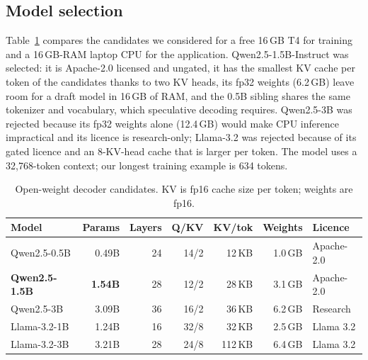 \documentclass[conference]{IEEEtran}
\begin{document}
\subsection{Model selection}
Table~\ref{tab:models} compares the candidates we considered for a free 16\,GB T4 for training and a 16\,GB-RAM laptop CPU for the application. Qwen2.5-1.5B-Instruct was selected: it is Apache-2.0 licensed and ungated, it has the smallest KV cache per token of the candidates thanks to two KV heads, its fp32 weights (6.2\,GB) leave room for a draft model in 16\,GB of RAM, and the 0.5B sibling shares the same tokenizer and vocabulary, which speculative decoding requires. Qwen2.5-3B was rejected because its fp32 weights alone (12.4\,GB) would make CPU inference impractical and its licence is research-only; Llama-3.2 was rejected because of its gated licence and an 8-KV-head cache that is larger per token. The model uses a 32{,}768-token context; our longest training example is 634 tokens.

\begin{table}[t]
\centering
\caption{Open-weight decoder candidates. KV is fp16 cache size per token; weights are fp16.}
\label{tab:models}
\setlength{\tabcolsep}{3pt}
\begin{tabular}{lrrrrrl}
\toprule
Model & Params & Layers & Q/KV & KV/tok & Weights & Licence \\
\midrule
Qwen2.5-0.5B & 0.49B & 24 & 14/2 & 12\,KB & 1.0\,GB & Apache-2.0 \\
\textbf{Qwen2.5-1.5B} & \textbf{1.54B} & 28 & 12/2 & 28\,KB & 3.1\,GB & Apache-2.0 \\
Qwen2.5-3B & 3.09B & 36 & 16/2 & 36\,KB & 6.2\,GB & Research \\
Llama-3.2-1B & 1.24B & 16 & 32/8 & 32\,KB & 2.5\,GB & Llama 3.2 \\
Llama-3.2-3B & 3.21B & 28 & 24/8 & 112\,KB & 6.4\,GB & Llama 3.2 \\
\bottomrule
\end{tabular}
\end{table}
\end{document}
